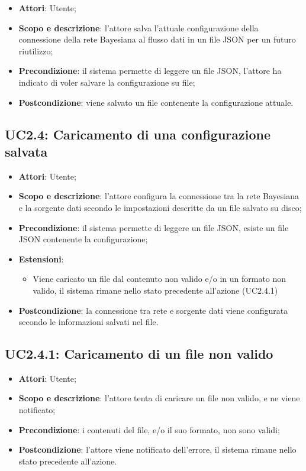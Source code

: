 \hypertarget{UC2.3}{}
\begin{itemize}
	\item \textbf{Attori}: Utente;
	\item \textbf{Scopo e descrizione}: l'attore salva l'attuale configurazione della connessione della rete Bayesiana al flusso dati in un file JSON per un futuro riutilizzo;
	\item \textbf{Precondizione}: il sistema permette di leggere un file JSON, l'attore ha indicato di voler salvare la configurazione su file;
	\item \textbf{Postcondizione}: viene salvato un file contenente la configurazione attuale.
\end{itemize}

\subsection{UC2.4: Caricamento di una configurazione salvata}
\hypertarget{UC2.4}{}
\begin{itemize}
	\item \textbf{Attori}: Utente;
	\item \textbf{Scopo e descrizione}: l'attore configura la connessione tra la rete Bayesiana e la sorgente dati secondo le impostazioni descritte da un file salvato su disco;
	\item \textbf{Precondizione}: il sistema permette di leggere un file JSON, esiste un file JSON contenente la configurazione;
	\item \textbf{Estensioni}: 
	\begin{itemize}
		\item  Viene caricato un file dal contenuto non valido e/o in un formato non valido, il sistema rimane nello stato precedente all'azione (UC2.4.1)
	\end{itemize}
	\item \textbf{Postcondizione}: la connessione tra rete e sorgente dati viene configurata secondo le informazioni salvati nel file.
\end{itemize}

\subsection{UC2.4.1: Caricamento di un file non valido}
\hypertarget{UC2.4.1}{}
\begin{itemize}
	\item \textbf{Attori}: Utente;
	\item \textbf{Scopo e descrizione}: l'attore tenta di caricare un file non valido, e ne viene notificato;
	\item \textbf{Precondizione}: i contenuti del file, e/o il suo formato, non sono validi;
	\item \textbf{Postcondizione}: l'attore viene notificato dell'errore, il sistema rimane nello stato precedente all'azione.
\end{itemize}


